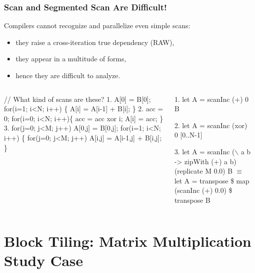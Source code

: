 \documentclass{beamer}
\newcommand{\mymath}[1]{$ #1 $}
\begin{document}
\begin{frame}[fragile,t]
  \frametitle{Scan and Segmented Scan Are Difficult!} 

Compilers cannot recognize and parallelize even simple scans:
\begin{itemize}
    \item they raise a cross-iteration true dependency (RAW),
    \item they appear in a multitude of forms,
    \item hence they are difficult to analyze.
\end  {itemize} 

\begin{columns}
\begin{colorcode}[fontsize=\scriptsize]
// What kind of scans are these?
1. A[0] = B[0];
   for(i=1; i<N; i++) \{
     A[i] = A[i-1] + B[i];
   \}
2. acc = 0;
   for(i=0; i<N; i++)\{
     acc = acc xor i;
     A[i] = acc;
   \}
3. for(j=0; j<M; j++) 
     A[0,j] = B[0,j];
   for(i=1; i<N; i++) \{
     for(j=0; j<M; j++)
       A[i,j] = A[i-1,j] + B[i,j];
   \}
\end{colorcode}
\begin{colorcode}[fontsize=\scriptsize]
1. let A = scanInc (+) 0 B

2. let A = scanInc (xor) 0 [0..N-1]

3. let A = scanInc (\mymath{\backslash} a b -> zipWith (+) a b) 
                   (replicate M 0.0) B \mymath{\equiv}
   let A = transpose \$ 
           map (scanInc (+) 0.0) \$
           transpose B 
             
\end{colorcode}
\end{columns}
\bigskip

\end{frame}

\section{Block Tiling: Matrix Multiplication Study Case}

\begin{frame}[fragile]
	\tableofcontents[currentsection]
\end{frame}
\end{document}
